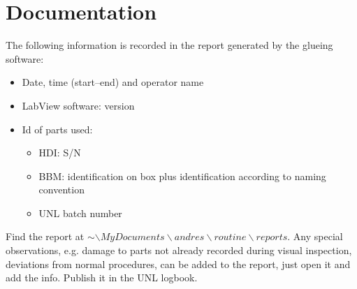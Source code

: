 \documentclass[12pt]{unlsilabsop}
\begin{document}
\section{Documentation}
The following information is recorded in the report generated by the glueing software:
\begin{itemize}
    \item Date, time (start--end) and operator name
    \item LabView software: version
    \item Id of parts used:
	\begin{itemize}
	    \item HDI: S/N
	    \item BBM: identification on box plus identification according to naming convention
	    \item UNL batch number
	\end{itemize}
\end{itemize}

Find the report at $\sim\backslash MyDocuments\backslash andres\backslash routine\backslash reports$. Any special observations, e.g. damage to parts not already recorded during visual inspection, deviations from normal procedures, can be added to the report, just open it  and add the info. Publish it in the UNL logbook. 
\end{document}
